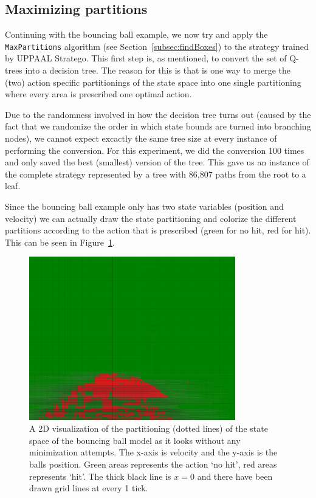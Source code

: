 \documentclass{article}
\begin{document}
\subsection{Maximizing partitions}%
\label{subsec:experimentsMaxParts}

Continuing with the bouncing ball example, we now try and apply the
\texttt{MaxPartitions} algorithm (see Section~\ref{subsec:findBoxes}) to the
strategy trained by UPPAAL Stratego.  This first step is, as mentioned, to
convert the set of Q-trees into a decision tree. The reason for this is that is
one way to merge the (two) action specific partitionings of the state space into
one single partitioning where every area is prescribed one optimal action.

Due to the randomness involved in how the decision tree turns out (caused by the
fact that we randomize the order in which state bounds are turned into branching
nodes), we cannot expect excactly the same tree size at every instance of
performing the conversion. For this experiment, we did the conversion 100 times
and only saved the best (smallest) version of the tree. This gave us an instance
of the complete strategy represented by a tree with 86,807 paths from the root
to a leaf.

Since the bouncing ball example only has two state variables (position and
velocity) we can actually draw the state partitioning and colorize the different
partitions according to the action that is prescribed (green for no hit, red for
hit). This can be seen in Figure~\ref{fig:ballPartitioningBefore}.

\begin{figure}[ht]
    \centering
    \includegraphics[width=0.8\textwidth]{ballPartitioningBefore}
    \caption{%
        A 2D visualization of the partitioning (dotted lines) of the state space
        of the bouncing ball model as it looks without any minimization
        attempts. The x-axis is velocity and the y-axis is the balls position.
        Green areas represents the action `no hit', red areas represents `hit'.
        The thick black line is $x=0$ and there have been drawn grid lines at
        every 1 tick.
    }\label{fig:ballPartitioningBefore}
\end{figure}
\end{document}
